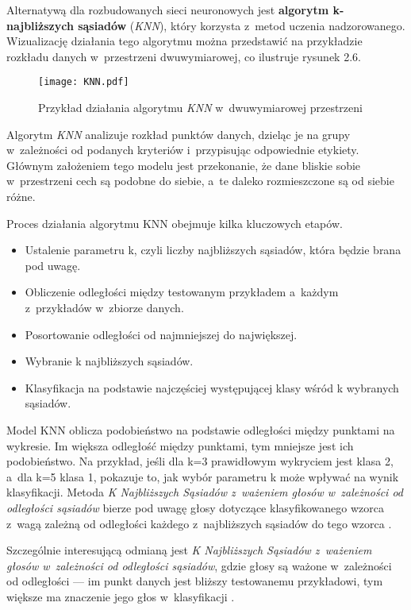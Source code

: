 Alternatywą dla rozbudowanych sieci neuronowych jest \textbf{algorytm k-najbliższych sąsiadów} (\textit{KNN}), który korzysta z~metod uczenia nadzorowanego. Wizualizację działania tego algorytmu można przedstawić na przykładzie rozkładu danych w~przestrzeni dwuwymiarowej, co ilustruje rysunek 2.6.

\begin{figure}[h]
	\centering
	\texttt{[image: KNN.pdf]}
	\caption{Przykład działania algorytmu \textit{KNN} w~dwuwymiarowej przestrzeni}
\end{figure}
\FloatBarrier %

Algorytm \textit{KNN} analizuje rozkład punktów danych, dzieląc je na grupy w~zależności od podanych kryteriów i~przypisując odpowiednie etykiety. Głównym założeniem tego modelu jest przekonanie, że dane bliskie sobie w~przestrzeni cech są podobne do siebie, a~te daleko rozmieszczone są od siebie różne.

Proces działania algorytmu KNN obejmuje kilka kluczowych etapów.
\begin{itemize}
	\item Ustalenie parametru k, czyli liczby najbliższych sąsiadów, która będzie brana pod uwagę.
	\item Obliczenie odległości między testowanym przykładem a~każdym z~przykładów w~zbiorze danych.
	\item Posortowanie odległości od najmniejszej do największej.
	\item Wybranie k najbliższych sąsiadów.
	\item Klasyfikacja na podstawie najczęściej występującej klasy wśród k wybranych sąsiadów.
\end{itemize}

Model KNN oblicza podobieństwo na podstawie odległości między punktami na wykresie. Im większa odległość między punktami, tym mniejsze jest ich podobieństwo. Na przykład, jeśli dla  k=3 prawidłowym wykryciem jest klasa 2, a~dla 
k=5 klasa 1, pokazuje to, jak wybór parametru k może wpływać na wynik klasyfikacji. Metoda \textit{K Najbliższych Sąsiadów z~ważeniem głosów w~zależności od odległości sąsiadów} bierze pod uwagę głosy dotyczące klasyfikowanego wzorca z~wagą zależną od odległości każdego z~najbliższych sąsiadów do tego wzorca \cite{KNN:AGH}.

Szczególnie interesującą odmianą jest \textit{K Najbliższych Sąsiadów z~ważeniem głosów w~zależności od odległości sąsiadów}, gdzie głosy są ważone w~zależności od odległości — im punkt danych jest bliższy testowanemu przykładowi, tym większe ma znaczenie jego głos w~klasyfikacji \cite{KNN:unite}.

